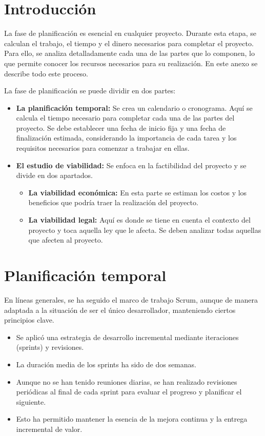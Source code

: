 
\section{Introducción}\label{plan-proyecto-introduccion}

La fase de planificación es esencial en cualquier proyecto. Durante esta etapa, se calculan el trabajo, el tiempo y el dinero necesarios para completar el proyecto. Para ello, se analiza detalladamente cada una de las partes que lo componen, lo que permite conocer los recursos necesarios para su realización. En este anexo se describe todo este proceso.

La fase de planificación se puede dividir en dos partes:

\begin{itemize}
  \item \textbf{La planificación temporal:} Se crea un calendario o cronograma. Aquí se calcula el tiempo necesario para completar cada una de las partes del proyecto. Se debe establecer una fecha de inicio fija y una fecha de finalización estimada, considerando la importancia de cada tarea y los requisitos necesarios para comenzar a trabajar en ellas.
  \item \textbf{El estudio de viabilidad:} Se enfoca en la factibilidad del proyecto y se divide en dos apartados. 
  \begin{itemize}
    \item \textbf{La viabilidad económica:} En esta parte se estiman los costos y los beneficios que podría traer la realización del proyecto. 
    \item \textbf{La viabilidad legal:} Aquí es donde se tiene en cuenta el contexto del proyecto y toca aquella ley que le afecta. Se deben analizar todas aquellas que afecten al proyecto.
  \end{itemize}
\end{itemize}

\section{Planificación temporal}\label{planificacion-temporal}

En líneas generales, se ha seguido el marco de trabajo Scrum, aunque de manera adaptada a la situación de ser el único desarrollador, manteniendo ciertos principios clave.

\begin{itemize}
  \item Se aplicó una estrategia de desarrollo incremental mediante iteraciones (sprints) y revisiones.
  \item La duración media de los sprints ha sido de dos semanas.
  \item Aunque no se han tenido reuniones diarias, se han realizado revisiones periódicas al final de cada sprint para evaluar el progreso y planificar el siguiente.
  \item Esto ha permitido mantener la esencia de la mejora continua y la entrega incremental de valor.
\end{itemize}

